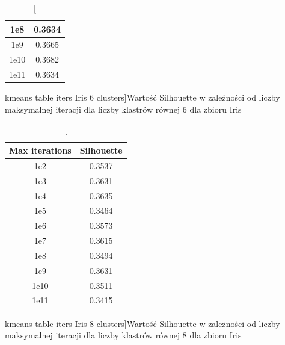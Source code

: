 \documentclass{classrep}
\begin{document}
{{\begin{table}[!htbp]
\begin{minipage}{.48\textwidth}
\begin{tabular}{|c|c|}
                        1e8 & 0.3634 \\ \hline
                        1e9 & 0.3665 \\ \hline
                        1e10 & 0.3682 \\ \hline
                        1e11 & 0.3634 \\ \hline
                    \end{tabular}
                    \caption
                    [kmeans table iters Iris 6 clusters]{Wartość Silhouette w
                    zależności od liczby maksymalnej iteracji dla liczby klastrów
                    równej 6 dla zbioru Iris}
                    \label{kmeans_table_iters_Iris_6_clusters}
                \end{minipage}
                \hfill
            \end{table}
            \FloatBarrier
            \begin{table}[!htbp]
                \begin{minipage}{.48\textwidth}
                    \centering
                    \begin{tabular}{|c|c|}
                        \hline
                        Max iterations & Silhouette \\ \hline
                        1e2 & 0.3537 \\ \hline
                        1e3 & 0.3631 \\ \hline
                        1e4 & 0.3635 \\ \hline
                        1e5 & 0.3464 \\ \hline
                        1e6 & 0.3573 \\ \hline
                        1e7 & 0.3615 \\ \hline
                        1e8 & 0.3494 \\ \hline
                        1e9 & 0.3631 \\ \hline
                        1e10 & 0.3511 \\ \hline
                        1e11 & 0.3415 \\ \hline
                    \end{tabular}
                    \caption
                    [kmeans table iters Iris 8 clusters]{Wartość Silhouette w
                    zależności od liczby maksymalnej iteracji dla liczby klastrów
                    równej 8 dla zbioru Iris}
                    \label{kmeans_table_iters_Iris_8_clusters}
                \end{minipage}

\end{table}}}
\end{document}
